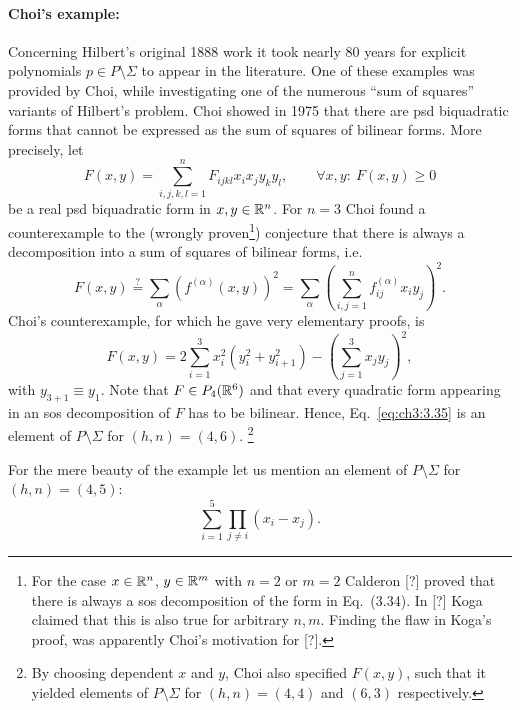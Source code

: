 \documentclass[11pt,a4paper]{article}
\numberwithin{equation}{section}
\begin{document}
\paragraph{Choi's example:}
Concerning Hilbert's original 1888 work it took nearly 80 years for explicit polynomials $p\in P\setminus \Sigma$ to
appear in the literature. One of these examples was provided by Choi, while investigating one of the numerous ``sum of
squares'' variants of Hilbert's problem. Choi showed in 1975 that there are psd biquadratic forms that cannot be
expressed as the sum of squares of bilinear forms. More precisely, let
\begin{equation}\label{eq:ch3:3.33}
    F(x,y)=\sum_{i,j,k,l=1}^n F_{ijkl}x_ix_jy_ky_l,
    \qquad \forall x,y:\ F(x,y)\ge 0
\end{equation}
be a real psd biquadratic form in $x,y\in \mathbb{R}^n$. For $n=3$ Choi found a counterexample to the (wrongly
proven\footnote{For the case $x\in \mathbb{R}^n$, $y\in \mathbb{R}^m$ with $n=2$ or $m=2$ Calderon [?] proved that there is always a
    sos decomposition of the form in Eq.~(3.34). In [?] Koga claimed that this is also true for arbitrary $n,m$. Finding
    the flaw in Koga's proof, was apparently Choi's motivation for [?].}) conjecture that there is always a decomposition
into a sum of squares of bilinear forms, i.e.
\begin{equation}\label{eq:ch3:3.34}
    F(x,y)
    \stackrel{?}{=}
    \sum_{\alpha}(f^{(\alpha)}(x,y))^2
    =
    \sum_{\alpha}\left(\sum_{i,j=1}^n f_{ij}^{(\alpha)}x_i y_j\right)^2.
\end{equation}
Choi's counterexample, for which he gave very elementary proofs, is
\begin{equation}\label{eq:ch3:3.35}
    F(x,y)=2\sum_{i=1}^3 x_i^2(y_i^2+y_{i+1}^2) - \left(\sum_{j=1}^3 x_jy_j\right)^2,
\end{equation}
with $y_{3+1}\equiv y_1$. Note that $F\in P_4(\mathbb{R}^6)$ and that every quadratic form appearing in an sos decomposition
of $F$ has to be bilinear. Hence, Eq.~\eqref{eq:ch3:3.35} is an element of $P\setminus \Sigma$ for $(h,n)=(4,6)$.
\footnote{By choosing dependent $x$ and $y$, Choi also specified $F(x,y)$, such that it yielded elements of
    $P\setminus \Sigma$ for $(h,n)=(4,4)$ and $(6,3)$ respectively.}

For the mere beauty of the example let us mention an element of $P\setminus \Sigma$ for $(h,n)=(4,5)$:
\begin{equation}\label{eq:ch3:3.36}
    \sum_{i=1}^5 \prod_{j\neq i}(x_i-x_j).
\end{equation}
\end{document}
